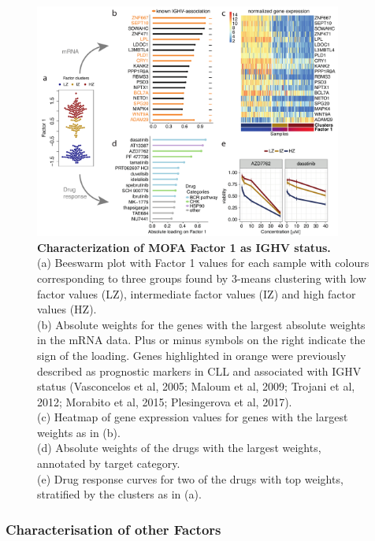 \begin{figure}[H]
	\centering 	
	\includegraphics[width=0.90\textwidth]{MOFA_CLL_Factor1}
	\caption{
	\textbf{Characterization of MOFA Factor 1 as IGHV status.}\\
	(a) Beeswarm plot with Factor 1 values for each sample with colours corresponding to three groups found by 3-means clustering with low factor values (LZ), intermediate factor values (IZ) and high factor values (HZ).\\
	(b) Absolute weights for the genes with the largest absolute weights in the mRNA data. Plus or minus symbols on the right indicate the sign of the loading. Genes highlighted in orange were previously described as prognostic markers in CLL and associated with IGHV status (Vasconcelos et al, 2005; Maloum et al, 2009; Trojani et al, 2012; Morabito et al, 2015; Plesingerova et al, 2017).\\
	(c) Heatmap of gene expression values for genes with the largest weights as in (b).\\
	(d) Absolute weights of the drugs with the largest weights, annotated by target category.\\
	(e) Drug response curves for two of the drugs with top weights, stratified by the clusters as in (a).
	}
	\label{fig:MOFA_CLL_Factor1}
\end{figure}

\subsubsection{Characterisation of other Factors}

